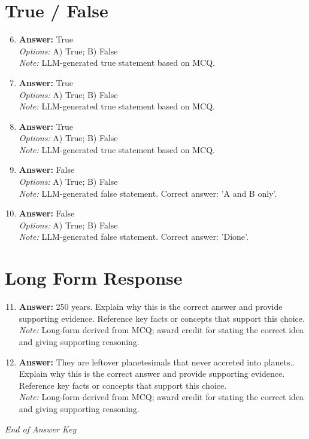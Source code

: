 \documentclass[12pt]{article}
\begin{document}
\section*{True / False}
\begin{enumerate}[label=\arabic*.]
\setcounter{enumi}{5}
\item \textbf{Answer:} True
\\ \textit{Options:} A) True; B) False
\\ \textit{Note:} LLM-generated true statement based on MCQ.
\item \textbf{Answer:} True
\\ \textit{Options:} A) True; B) False
\\ \textit{Note:} LLM-generated true statement based on MCQ.
\item \textbf{Answer:} True
\\ \textit{Options:} A) True; B) False
\\ \textit{Note:} LLM-generated true statement based on MCQ.
\item \textbf{Answer:} False
\\ \textit{Options:} A) True; B) False
\\ \textit{Note:} LLM-generated false statement. Correct answer: 'A and B only'.
\item \textbf{Answer:} False
\\ \textit{Options:} A) True; B) False
\\ \textit{Note:} LLM-generated false statement. Correct answer: 'Dione'.
\end{enumerate}

\section*{Long Form Response}
\begin{enumerate}[label=\arabic*.]
\setcounter{enumi}{10}
\item \textbf{Answer:} 250 years. Explain why this is the correct answer and provide supporting evidence. Reference key facts or concepts that support this choice.
\\ \textit{Note:} Long-form derived from MCQ; award credit for stating the correct idea and giving supporting reasoning.
\item \textbf{Answer:} They are leftover planetesimals that never accreted into planets.. Explain why this is the correct answer and provide supporting evidence. Reference key facts or concepts that support this choice.
\\ \textit{Note:} Long-form derived from MCQ; award credit for stating the correct idea and giving supporting reasoning.
\end{enumerate}

\vfill
\noindent\textit{End of Answer Key}
\end{document}
